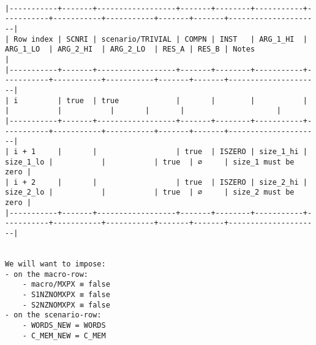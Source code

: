 \documentclass[varwidth=\maxdimen,margin=0.5cm,multi={verbatim}]{standalone}
\begin{document}
\begin{verbatim}

|-----------+-------+------------------+-------+--------+-----------+-----------+-----------+-----------+-------+-------+---------------------|
| Row index | SCNRI | scenario/TRIVIAL | COMPN | INST   | ARG_1_HI  | ARG_1_LO  | ARG_2_HI  | ARG_2_LO  | RES_A | RES_B | Notes               |
|-----------+-------+------------------+-------+--------+-----------+-----------+-----------+-----------+-------+-------+---------------------|
| i         | true  | true             |       |        |           |           |           |           |       |       |                     |
|-----------+-------+------------------+-------+--------+-----------+-----------+-----------+-----------+-------+-------+---------------------|
| i + 1     |       |                  | true  | ISZERO | size_1_hi | size_1_lo |           |           | true  | ∅     | size_1 must be zero |
| i + 2     |       |                  | true  | ISZERO | size_2_hi | size_2_lo |           |           | true  | ∅     | size_2 must be zero |
|-----------+-------+------------------+-------+--------+-----------+-----------+-----------+-----------+-------+-------+---------------------|


We will want to impose:
- on the macro-row:
	- macro/MXPX ≡ false
	- S1NZNOMXPX ≡ false
	- S2NZNOMXPX ≡ false
- on the scenario-row:
	- WORDS_NEW = WORDS
	- C_MEM_NEW = C_MEM

\end{verbatim}
\end{document}
